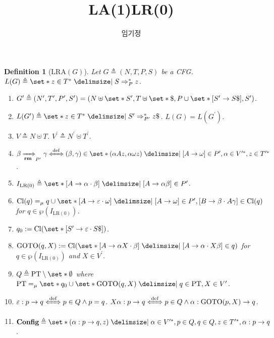 \documentclass[12pt]{article}
\title{LA(1)LR(0)}
\author{임기정}
\newtheorem{definition}[theorem]{Definition}
\newcommand{\powerset}
{ \wp }
\begin{document}
\thispagestyle{empty}

\begin{definition}[$\mathrm{LRA}(G)$]
Let $G \triangleq ( N , T , P , S )$ be a CFG. $L ( G ) \triangleq \set*{ z \in { T }^\ast \mid S \Rightarrow_{P}^\ast z }$.
\begin{enumerate} \setlength{\itemsep}{0.2pt} \setlength{\parskip}{0.2pt}
\item[$\mathrm{(i)}$] $G^\prime \triangleq ( N^\prime , T^\prime , P^\prime , S^\prime ) = ( N \uplus \set*{ S^\prime } , T \uplus \set*{ \$ } , P \cup \set*{ [ S^\prime \to S \$ ] } , S^\prime )$.
\item[$\mathrm{(ii)}$] $L ( G^\prime ) \triangleq \set*{ z \in { T }^\ast \mid S^\prime \Rightarrow_{P^\prime}^\ast z \$ }$. $L ( G ) = L ( G^\prime )$.
\item[$\mathrm{(iii)}$] $V \triangleq N \uplus T$. $V^\prime \triangleq N^\prime \uplus T^\prime$.
\item[$\mathrm{(iv)}$] $\beta \xRightarrow[\mathbf{rm}]{}_{P^\prime} \gamma \xLeftrightarrow[]{\mathrm{def}} ( \beta , \gamma ) \in \set*{ ( \alpha A z , \alpha \omega z ) \mid [ A \to \omega ] \in P^\prime , \alpha \in V^{\prime \ast}, z \in T^{\prime \ast} }$.
\item[$\mathrm{(v)}$] $I_{\mathrm{LR(0)}} \triangleq \set*{ [ A \to \alpha \cdot \beta ] \mid [ A \to \alpha \beta ] \in P^\prime }$.
\item[$\mathrm{(vi)}$] $\mathrm{Cl} ( q ) =_\mu q \cup \set*{ [ A \to \varepsilon \cdot \omega ] \mid [ A \to \omega ] \in P^\prime , [ B \to \beta \cdot A \gamma ] \in \mathrm{Cl} ( q ) }$ for $ q \in \powerset ( I_{\mathrm{LR(0)}} ) $.
\item[$\mathrm{(vii)}$] $q_0 := \mathrm{Cl} ( \set*{ [ S^\prime \to \varepsilon \cdot S \$ ] } )$.
\item[$\mathrm{(viii)}$] $\mathrm{GOTO} ( q , X ) := \mathrm{Cl} ( \set*{ [ A \to \alpha X \cdot \beta ] \mid [ A \to \alpha \cdot X \beta ] \in q } )$ for $q \in \powerset ( I_{\mathrm{LR(0)}} )$ and $X \in V^\prime$.
\item[$\mathrm{(ix)}$] $Q \triangleq \mathrm{PT} \setminus \set*{ \emptyset }$ where $\mathrm{PT} =_\mu \set*{ q_0 } \cup \set*{ \mathrm{GOTO} ( q , X ) \mid q \in \mathrm{PT} , X \in V^\prime }$.
\item[$\mathrm{(x)}$] $\varepsilon : p \to q \xLeftrightarrow[]{\mathrm{def}} p \in Q \land p = q$. $X \alpha : p \to q \xLeftrightarrow[]{\mathrm{def}} p \in Q \land \alpha : \mathrm{GOTO} ( p , X ) \to q$.
\item[$\mathrm{(xi)}$] $\mathbf{Config} \triangleq \set*{ ( \alpha : p \to q , z ) \mid \alpha \in V^{\prime \ast}, p \in Q , q \in Q , z \in T^{\prime \ast} , \alpha : p \to q } $.

\end{enumerate}
\end{definition}
\end{document}
